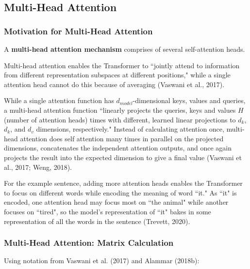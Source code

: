 \subsection{Multi-Head Attention} \label{sec:MultiHeadAttention}

\subsubsection{Motivation for Multi-Head Attention}


A \textbf{multi-head attention mechanism} comprises of several self-attention heads. 

Multi-head attention enables the Transformer to ``jointly attend to information from different representation subspaces at different positions," while a single attention head cannot do this because of averaging (Vaswani et al., 2017). 

While a single attention function has $d_{model}$-dimensional keys, values and queries, a multi-head attention function ``linearly projects the queries, keys and values $H$ (number of attention heads) times with different, learned linear projections to $d_k$, $d_k$, and $d_v$ dimensions, respectively." Instead of calculating attention once, multi-head attention does self attention many times in parallel on the projected dimensions, concatenates the independent attention outputs, and once again projects the result into the expected dimension to give a final value (Vaswani et al., 2017; Weng, 2018). 

For the example sentence, adding more attention heads enables the Transformer to focus on different words while encoding the meaning of word ``it." As ``it" is encoded, one attention head may focus most on ``the animal" while another focuses on ``tired", so the model's representation of ``it" bakes in some representation of all the words in the sentence (Trevett, 2020). 

\subsubsection{Multi-Head Attention: Matrix Calculation}

Using notation from Vaswani et al. (2017) and Alammar (2018b): 

